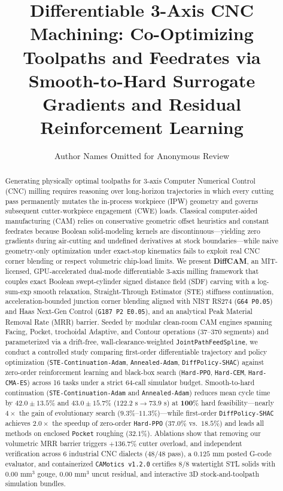 \documentclass[conference]{IEEEtran}
\begin{document}
\title{Differentiable 3-Axis CNC Machining: Co-Optimizing Toolpaths and Feedrates via Smooth-to-Hard Surrogate Gradients and Residual Reinforcement Learning}

\author{Author Names Omitted for Anonymous Review}

\maketitle

\begin{abstract}
Generating physically optimal toolpaths for 3-axis Computer Numerical Control (CNC) milling requires reasoning over long-horizon trajectories in which every cutting pass permanently mutates the in-process workpiece (IPW) geometry and governs subsequent cutter-workpiece engagement (CWE) loads. Classical computer-aided manufacturing (CAM) relies on conservative geometric offset heuristics and constant feedrates because Boolean solid-modeling kernels are discontinuous—yielding zero gradients during air-cutting and undefined derivatives at stock boundaries—while naive geometry-only optimization under exact-stop kinematics fails to exploit real CNC corner blending or respect volumetric chip-load limits. We present \textbf{DiffCAM}, an MIT-licensed, GPU-accelerated dual-mode differentiable 3-axis milling framework that couples exact Boolean swept-cylinder signed distance field (SDF) carving with a log-sum-exp smooth relaxation, Straight-Through Estimator (STE) stiffness continuation, acceleration-bounded junction corner blending aligned with NIST RS274 (\texttt{G64 P0.05}) and Haas Next-Gen Control (\texttt{G187 P2 E0.05}), and an analytical Peak Material Removal Rate (MRR) barrier. Seeded by modular clean-room CAM engines spanning Facing, Pocket, trochoidal Adaptive, and Contour operations ($37$--$370$ segments) and parameterized via a drift-free, wall-clearance-weighted \texttt{JointPathFeedSpline}, we conduct a controlled study comparing first-order differentiable trajectory and policy optimization (\texttt{STE-Continuation-Adam}, \texttt{Annealed-Adam}, \texttt{DiffPolicy-SHAC}) against zero-order reinforcement learning and black-box search (\texttt{Hard-PPO}, \texttt{Hard-CEM}, \texttt{Hard-CMA-ES}) across 16 tasks under a strict 64-call simulator budget. Smooth-to-hard continuation (\texttt{STE-Continuation-Adam} and \texttt{Annealed-Adam}) reduces mean cycle time by $\mathbf{42.0 \pm 13.5\%}$ and $\mathbf{43.0 \pm 15.7\%}$ ($122.2\text{ s} \to 73.9\text{ s}$) at $\mathbf{100\%}$ hard feasibility—nearly $4\times$ the gain of evolutionary search ($9.3\%$--$11.3\%$)—while first-order \texttt{DiffPolicy-SHAC} achieves $2.0\times$ the speedup of zero-order \texttt{Hard-PPO} ($\mathbf{37.0\%}$ vs.\ $\mathbf{18.5\%}$) and leads all methods on enclosed \texttt{Pocket} roughing ($\mathbf{32.1\%}$). Ablations show that removing our volumetric MRR barrier triggers $+136.7\%$ cutter overload, and independent verification across 6 industrial CNC dialects ($48/48$ pass), a $0.125\text{ mm}$ posted G-code evaluator, and containerized \texttt{CAMotics v1.2.0} certifies $8/8$ watertight STL solids with $0.00\text{ mm}^3$ gouge, $0.00\text{ mm}^3$ uncut residual, and interactive 3D stock-and-toolpath simulation bundles.

\end{abstract}
\end{document}
